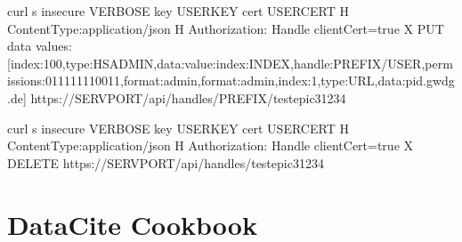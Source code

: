\documentclass[a4paper,10pt,english]{sphinxmanual}
\begin{document}
\begin{sphinxVerbatim}[commandchars=\\\{\}]
curl \PYGZhy{}s \PYGZhy{}\PYGZhy{}insecure \PYGZdl{}\PYGZob{}VERBOSE\PYGZcb{} \PYGZhy{}\PYGZhy{}key \PYGZdl{}\PYGZob{}USERKEY\PYGZcb{} \PYGZhy{}\PYGZhy{}cert \PYGZdl{}\PYGZob{}USERCERT\PYGZcb{} \PYGZhy{}H \PYGZdq{}Content\PYGZhy{}Type:application/json\PYGZdq{} \PYGZhy{}H \PYGZsq{}Authorization: Handle clientCert=\PYGZdq{}true\PYGZdq{}\PYGZsq{} \PYGZhy{}X PUT \PYGZhy{}\PYGZhy{}data  \PYGZsq{}\PYGZob{}\PYGZdq{}values\PYGZdq{}:[\PYGZob{}\PYGZdq{}index\PYGZdq{}:100,\PYGZdq{}type\PYGZdq{}:\PYGZdq{}HS\PYGZus{}ADMIN\PYGZdq{},\PYGZdq{}data\PYGZdq{}:\PYGZob{}\PYGZdq{}value\PYGZdq{}:\PYGZob{}\PYGZdq{}index\PYGZdq{}:\PYGZsq{}\PYGZdl{}\PYGZob{}INDEX\PYGZcb{}\PYGZsq{},\PYGZdq{}handle\PYGZdq{}:\PYGZdq{}\PYGZsq{}\PYGZdl{}\PYGZob{}PREFIX\PYGZcb{}\PYGZsq{}\PYGZbs{}/\PYGZsq{}\PYGZdl{}\PYGZob{}USER\PYGZcb{}\PYGZsq{}\PYGZdq{},\PYGZdq{}permissions\PYGZdq{}:\PYGZdq{}011111110011\PYGZdq{},\PYGZdq{}format\PYGZdq{}:\PYGZdq{}admin\PYGZdq{}\PYGZcb{},\PYGZdq{}format\PYGZdq{}:\PYGZdq{}admin\PYGZdq{}\PYGZcb{}\PYGZcb{},\PYGZob{}\PYGZdq{}index\PYGZdq{}:1,\PYGZdq{}type\PYGZdq{}:\PYGZdq{}URL\PYGZdq{},\PYGZdq{}data\PYGZdq{}:\PYGZdq{}pid.gwdg.de\PYGZdq{}\PYGZcb{}]\PYGZcb{}\PYGZsq{} https://\PYGZdl{}\PYGZob{}SERVPORT\PYGZcb{}/api/handles/\PYGZdl{}\PYGZob{}PREFIX\PYGZcb{}/test\PYGZus{}epic3\PYGZus{}1234
\end{sphinxVerbatim}

\sphinxAtStartPar
{}

\begin{sphinxVerbatim}[commandchars=\\\{\}]
curl \PYGZhy{}s \PYGZhy{}\PYGZhy{}insecure \PYGZdl{}\PYGZob{}VERBOSE\PYGZcb{} \PYGZhy{}\PYGZhy{}key \PYGZdl{}\PYGZob{}USERKEY\PYGZcb{} \PYGZhy{}\PYGZhy{}cert \PYGZdl{}\PYGZob{}USERCERT\PYGZcb{} \PYGZhy{}H \PYGZdq{}Content\PYGZhy{}Type:application/json\PYGZdq{} \PYGZhy{}H \PYGZsq{}Authorization: Handle clientCert=\PYGZdq{}true\PYGZdq{}\PYGZsq{} \PYGZhy{}X DELETE  https://\PYGZdl{}\PYGZob{}SERVPORT\PYGZcb{}/api/handles/test\PYGZus{}epic3\PYGZus{}1234
\end{sphinxVerbatim}


\chapter{DataCite Cookbook}
\label{\detokenize{datacite-cookbook/index:datacite-cookbook}}\label{\detokenize{datacite-cookbook/index:id1}}\label{\detokenize{datacite-cookbook/index::doc}}
\end{document}

